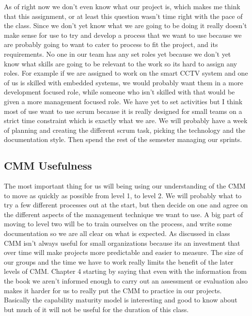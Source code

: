 \documentclass[11pt, indentfirst]{article}
\begin{document}
  As of right now we don't even know what our project is, which makes me think that this assignment, or at least this question wasn't time right with the pace of the class.
  Since we don't yet know what we are going to be doing it really doesn't make sense for use to try and develop a process that we want to use because we are probably going
  to want to cater to process to fit the project, and its requirements. No one in our team has any set roles yet because we don't yet know what skills are going to be
  relevant to the work so its hard to assign any roles. For example if we are assigned to work on the smart CCTV system and one of us is skilled with embedded systems,
  we would probably want them in a more development focused role, while someone who isn't skilled with that would be given a more management focused role. We have yet to
  set activities but I think most of use want to use scrum because it is really designed for small teams on a strict time constraint which is exactly what we are. We will
  probably have a week of planning and creating the different scrum task, picking the technology and the documentation style. Then spend the rest of the semester
  managing our sprints.

  \subsection{CMM Usefulness}

  The most important thing for us will being using our understanding of the CMM to move as quickly as possible from level 1, to level 2. We will probably what
  to try a few different processes out at the start, but then decide on one and agree on the different aspects of the management technique we want to use. A big
  part of moving to level two will be to train ourselves on the process, and write some documentation so we are all clear on what is expected. As discussed in class
  CMM isn't always useful for small organizations because its an investment that over time will make projects more predictable and easier to measure. The size of our
  groups and the time we have to work really limits the benefit of the later levels of CMM. Chapter 4 starting by saying that even with the information
  from the book we aren't informed enough to carry out an assessment or evaluation also makes it harder for us to really put the CMM to practice in our projects. Basically
  the capability maturity model is interesting and good to know about but much of it will not be useful for the duration of this class.
\end{document}
